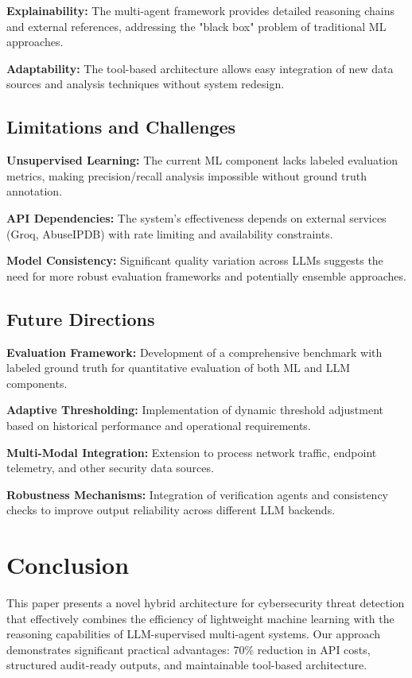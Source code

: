 \documentclass[11pt,twocolumn]{article}
\begin{document}
\textbf{Explainability:} The multi-agent framework provides detailed reasoning chains and external references, addressing the "black box" problem of traditional ML approaches.

\textbf{Adaptability:} The tool-based architecture allows easy integration of new data sources and analysis techniques without system redesign.

\subsection{Limitations and Challenges}

\textbf{Unsupervised Learning:} The current ML component lacks labeled evaluation metrics, making precision/recall analysis impossible without ground truth annotation.

\textbf{API Dependencies:} The system's effectiveness depends on external services (Groq, AbuseIPDB) with rate limiting and availability constraints.

\textbf{Model Consistency:} Significant quality variation across LLMs suggests the need for more robust evaluation frameworks and potentially ensemble approaches.

\subsection{Future Directions}

\textbf{Evaluation Framework:} Development of a comprehensive benchmark with labeled ground truth for quantitative evaluation of both ML and LLM components.

\textbf{Adaptive Thresholding:} Implementation of dynamic threshold adjustment based on historical performance and operational requirements.

\textbf{Multi-Modal Integration:} Extension to process network traffic, endpoint telemetry, and other security data sources.

\textbf{Robustness Mechanisms:} Integration of verification agents and consistency checks to improve output reliability across different LLM backends.

\section{Conclusion}

This paper presents a novel hybrid architecture for cybersecurity threat detection that effectively combines the efficiency of lightweight machine learning with the reasoning capabilities of LLM-supervised multi-agent systems. Our approach demonstrates significant practical advantages: 70\% reduction in API costs, structured audit-ready outputs, and maintainable tool-based architecture.
\end{document}
